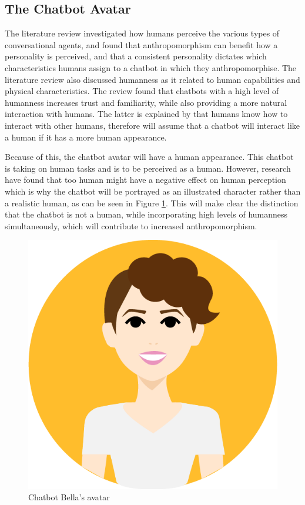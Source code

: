         
\vspace{5mm}

    \subsection{The Chatbot Avatar}
    The literature review investigated how humans perceive the various types of conversational agents, and found that anthropomorphism can benefit how a personality is perceived, and that a consistent personality dictates which characteristics humans assign to a chatbot in which they anthropomorphise. The literature review also discussed humanness as it related to human capabilities and physical characteristics. The review found that chatbots with a high level of humanness increases trust and familiarity, while also providing a more natural interaction with humans. The latter is explained by that humans know how to interact with other humans, therefore will assume that a chatbot will interact like a human if it has a more human appearance. 
        
    Because of this, the chatbot avatar will have a human appearance. This chatbot is taking on human tasks and is to be perceived as a human. However, research have found that too human might have a negative effect on human perception which is why the chatbot will be portrayed as an illustrated character rather than a realistic human, as can be seen in Figure \ref{fig:avatar}. This will make clear the distinction that the chatbot is not a human, while incorporating high levels of humanness simultaneously, which will contribute to increased anthropomorphism.
    
    \begin{figure}[H]
        \centering
        \includegraphics[scale=0.35]{figures/Bella_avatar.png}
        \caption{Chatbot Bella's avatar}
        \label{fig:avatar}
    \end{figure}
    
